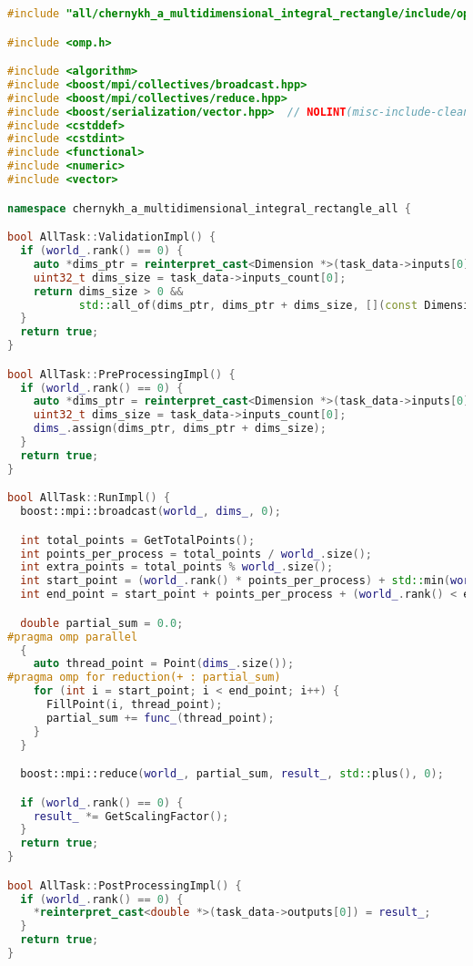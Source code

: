 \documentclass[a4paper,12pt]{article}
\begin{document}
  \begin{lstlisting}[language=C++,label={lst:mpi+openmp}]
#include "all/chernykh_a_multidimensional_integral_rectangle/include/ops_all.hpp"

#include <omp.h>

#include <algorithm>
#include <boost/mpi/collectives/broadcast.hpp>
#include <boost/mpi/collectives/reduce.hpp>
#include <boost/serialization/vector.hpp>  // NOLINT(misc-include-cleaner)
#include <cstddef>
#include <cstdint>
#include <functional>
#include <numeric>
#include <vector>

namespace chernykh_a_multidimensional_integral_rectangle_all {

bool AllTask::ValidationImpl() {
  if (world_.rank() == 0) {
    auto *dims_ptr = reinterpret_cast<Dimension *>(task_data->inputs[0]);
    uint32_t dims_size = task_data->inputs_count[0];
    return dims_size > 0 &&
           std::all_of(dims_ptr, dims_ptr + dims_size, [](const Dimension &dim) -> bool { return dim.IsValid(); });
  }
  return true;
}

bool AllTask::PreProcessingImpl() {
  if (world_.rank() == 0) {
    auto *dims_ptr = reinterpret_cast<Dimension *>(task_data->inputs[0]);
    uint32_t dims_size = task_data->inputs_count[0];
    dims_.assign(dims_ptr, dims_ptr + dims_size);
  }
  return true;
}

bool AllTask::RunImpl() {
  boost::mpi::broadcast(world_, dims_, 0);

  int total_points = GetTotalPoints();
  int points_per_process = total_points / world_.size();
  int extra_points = total_points % world_.size();
  int start_point = (world_.rank() * points_per_process) + std::min(world_.rank(), extra_points);
  int end_point = start_point + points_per_process + (world_.rank() < extra_points ? 1 : 0);

  double partial_sum = 0.0;
#pragma omp parallel
  {
    auto thread_point = Point(dims_.size());
#pragma omp for reduction(+ : partial_sum)
    for (int i = start_point; i < end_point; i++) {
      FillPoint(i, thread_point);
      partial_sum += func_(thread_point);
    }
  }

  boost::mpi::reduce(world_, partial_sum, result_, std::plus(), 0);

  if (world_.rank() == 0) {
    result_ *= GetScalingFactor();
  }
  return true;
}

bool AllTask::PostProcessingImpl() {
  if (world_.rank() == 0) {
    *reinterpret_cast<double *>(task_data->outputs[0]) = result_;
  }
  return true;
}


\end{lstlisting}
\end{document}
